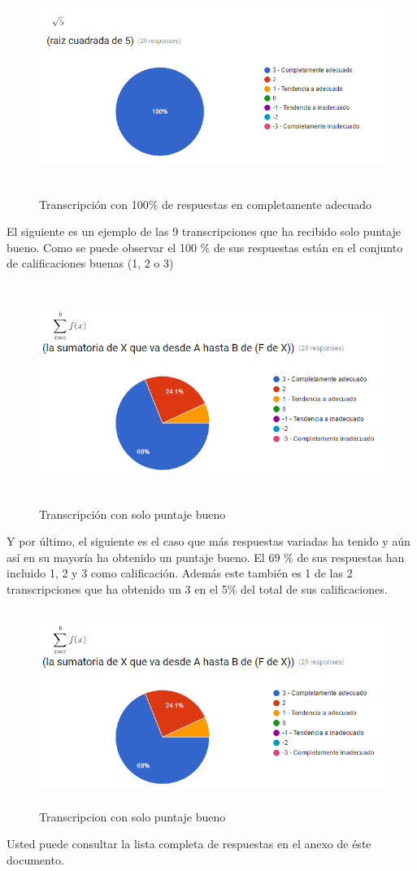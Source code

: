 \begin{figure}[H]
\centering
  \includegraphics[width=15cm, height=6.93cm]{Figures/captura2}
  \caption[]{Transcripción con 100\% de respuestas en completamente adecuado}
\label{fig:captura2}
\end{figure}

El siguiente es un ejemplo de las 9 transcripciones que ha recibido solo puntaje bueno. Como se puede observar el 100 \% de sus respuestas están en el conjunto de calificaciones buenas (1, 2 o 3)

\begin{figure}[H]
\centering
  \includegraphics[width=15cm, height=7.15cm]{Figures/captura1}
  \caption[]{Transcripción con solo puntaje bueno}
\label{fig:captura1}
\end{figure}

Y por último, el siguiente es el caso que más respuestas variadas ha tenido y aún así en su mayoría ha obtenido un puntaje bueno. El 69 \% de sus respuestas han incluido 1, 2 y 3 como calificación. Además este también es 1 de las 2 transcripciones que ha obtenido un 3 en el 5\% del total de sus calificaciones.

\begin{figure}[H]
\centering
  \includegraphics[width=15cm, height=6.39cm]{Figures/captura1}
  \caption[]{Transcripcion con solo puntaje bueno}
\label{fig:captura1}
\end{figure}

Usted puede consultar la lista completa de respuestas en el anexo de éste documento.